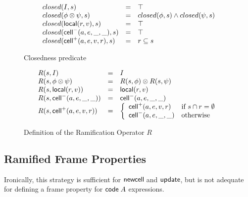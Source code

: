 \documentclass[preprint,natbib]{sigplanconf}
\begin{document}
\begin{figure}
  \begin{displaymath}
    \begin{array}{lcl}
      closed(I, s) & = & \top \\
      closed(\phi \otimes \psi, s) & = & closed(\phi, s) \land closed(\psi, s) \\ 
      closed(\mbox{\textsf{{local}}}({r}, {v}), s) & = & \top \\
      closed(\mbox{\textsf{{cell}}}^{-}({a}, {e}, {\_}, {\_}), s) & = & \top \\
      closed(\mbox{\textsf{{cell}}}^{+}({a}, {e}, {v}, {r}), s) & = & r \subseteq s \\
    \end{array}
  \end{displaymath}
\caption{Closedness predicate}
\label{closedness}  
\end{figure}

\begin{figure}
  \begin{displaymath}
    \begin{array}{lcl}
      R(s, I)                 & = & I \\
      R(s, \phi \otimes \psi) & = & R(s, \phi) \otimes R(s, \psi) \\
      R(s, \mbox{\textsf{{local}}}({r}, {v}))   & = & \mbox{\textsf{{local}}}({r}, {v}) \\
      R(s, \mbox{\textsf{{cell}}}^{-}({a}, {e}, {\_}, {\_}))    & = & \mbox{\textsf{{cell}}}^{-}({a}, {e}, {\_}, {\_}) \\
      R(s, \mbox{\textsf{{cell}}}^{+}({a}, {e}, {v}, {r})) & = & \left\{\begin{array}{ll}
                                                \mbox{\textsf{{cell}}}^{+}({a}, {e}, {v}, {r}) 
                                              & \mbox{if } s \cap r = \emptyset \\
                                                \mbox{\textsf{{cell}}}^{-}({a}, {e}, {\_}, {\_})
                                              & \mbox{otherwise}
                                              \end{array}
                                       \right.
    \end{array}
  \end{displaymath}
\caption{Definition of the Ramification Operator $R$}
\label{ramify-def}
\end{figure}

\subsection{Ramified Frame Properties}

Ironically, this strategy is sufficient for $\mbox{\textsf{{newcell}}}\;$and
$\mbox{\textsf{{update}}}$, but is not adequate for defining a frame property
for $\mbox{\textsf{{code}}}\;{A}$ expressions. 
\end{document}

